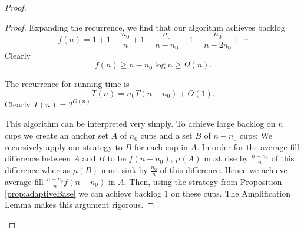 \documentclass[twocolumn]{article}[10pt]
\begin{document}
\begin{proof}
\begin{proof}
    Expanding the recurrence, we find that our algorithm achieves backlog 
    $$f(n) = 1+ 1-\frac{n_0}{n} + 1-\frac{n_0}{n-n_0} + 1-\frac{n_0}{n-2n_0} + \cdots $$
    Clearly 
    $$f(n) \ge n - n_0 \log n \ge \Omega(n).$$

    The recurrence for running time is 
    $$T(n) = n_0T(n-n_0)+O(1).$$
    Clearly $T(n) = 2^{O(n)}$.

    This algorithm can be interpreted very simply. To achieve large backlog on
    $n$ cups we create an anchor set $A$ of $n_0$ cups and a set $B$ of $n-n_0$
    cups; We recursively apply our strategy to $B$ for each cup in $A$. In
    order for the average fill difference between $A$ and $B$ to be $f(n-n_0)$,
    $\mu(A)$ must rise by $\frac{n-n_0}{n}$ of this difference whereas $\mu(B)$
    must sink by $\frac{n_0}{n}$ of this difference. Hence we achieve average
    fill $\frac{n-n_0}{n}f(n-n_0)$ in $A$. Then, using the strategy from
    Proposition \ref{prop:adaptiveBase} we can achieve backlog $1$ on these
    cups. The Amplification Lemma makes this argument rigorous.


  \end{proof}


\end{proof}
\end{document}
